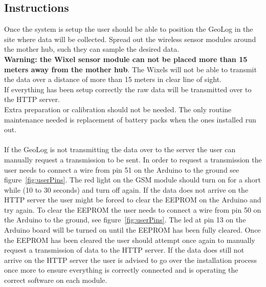 \subsection{Instructions}
Once the system is setup the user should be able to position the GeoLog in the site where data will be collected. Spread out the wireless sensor modules around the mother hub, such they can sample the desired data.\\
\textbf{Warning: the Wixel sensor module can not be placed more than 15 meters away from the mother hub}. The Wixels will not be able to transmit the data over a distance of more than 15 meters in clear line of sight.\\
If everything has been setup correctly the raw data will be transmitted over to the HTTP server.\\
Extra preparation or calibration should not be needed. The only routine maintenance needed is replacement of battery packs when the ones installed run out.\\\\ %
If the GeoLog is not transmitting the data over to the server the user can manually request a transmission to be sent. In order to request a transmission the user needs to connect a wire from pin 51 on the Arduino to the ground see figure~\ref{fig:userPins}. The red light on the GSM module should turn on for a short while (10 to 30 seconds) and turn off again. If the data does not arrive on the HTTP server the user might be forced to clear the EEPROM on the Arduino and try again. To clear the EEPROM the user needs to connect a wire from pin 50 on the Arduino to the ground, see figure~\ref{fig:userPins}. The led at pin 13 on the Arduino board will be turned on until the EEPROM has been fully cleared. Once the EEPROM has been cleared the user should attempt once again to manually request a transmission of data to the HTTP server. If the data does still not arrive on the HTTP server the user is advised to go over the installation process once more to ensure everything is correctly connected and is operating the correct software on each module.

